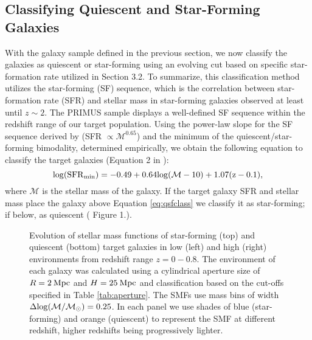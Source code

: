 \documentclass{emulateapj}
\begin{document}
\subsection{Classifying Quiescent and Star-Forming Galaxies} \label{sec:sfq}
With the galaxy sample defined in the previous section, we now classify the galaxies as quiescent or star-forming using an evolving cut based on specific star-formation rate utilized in \cite{Moustakas:2013aa} Section 3.2.
To summarize, this classification method utilizes the star-forming (SF) sequence, which is the correlation between star-formation rate (SFR) and stellar mass in star-forming 
galaxies observed at least until $z \sim 2$.
The PRIMUS sample displays a well-defined SF sequence within the redshift range of our target population.
Using the power-law slope for the SF sequence derived by \cite{Salim:2007aa} (SFR $\propto \mathcal{M}^{0.65}$) and the minimum of the quiescent/star-forming bimodality, 
determined empirically, we obtain the following equation to classify the target galaxies (Equation 2 in \cite{Moustakas:2013aa}):
\begin{equation}
\label{eq:qsfclass} 
\rm{log}(\rm{SFR}_{\rm{min}}) = -0.49 + 0.64 \rm{log}(\mathcal{M} - 10) +1.07(z-0.1), 
\end{equation}
where $\mathcal{M}$ is the stellar mass of the galaxy.
If the target galaxy SFR and stellar mass place the galaxy above Equation \ref{eq:qsfclass} we classify it as star-forming; if below, as quiescent (\cite{Moustakas:2013aa} Figure 1.).

\begin{figure*}
  \begin{center}
    \leavevmode
     \caption{Evolution of stellar mass functions of star-forming (top) and quiescent (bottom) target galaxies in 
low (left) and high (right) environments from redshift range $z=0-0.8$. The environment of each galaxy  
was calculated using a cylindrical aperture size of $R=2 \: \rm{Mpc}$ and $H=25 \: \rm{Mpc}$ and  
classification based on the cut-offs specified in Table \ref{tab:aperture}. The SMFs use mass bins of 
width $\Delta \rm{log}(\mathcal{M}/\mathcal{M}_{\odot})=0.25$. In each panel we use shades of blue 
(star-forming) and orange (quiescent) to represent the SMF at different redshift, higher redshifts being
progressively lighter.}      \label{fig:smf}
    \end{center}
\end{figure*}
\end{document}
